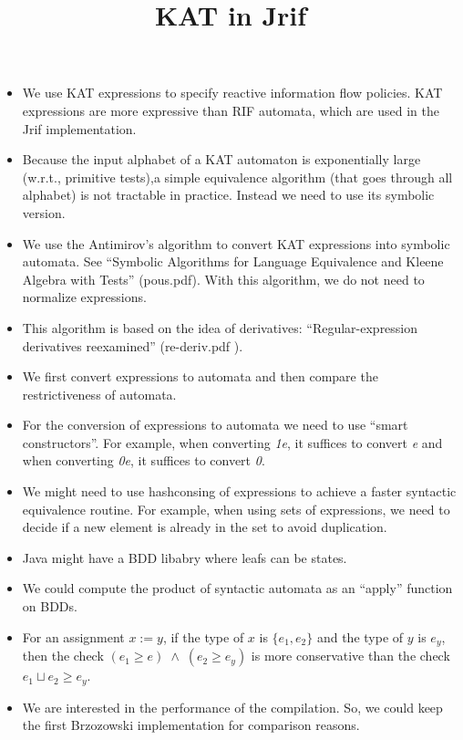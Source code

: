 \documentclass[10pt]{article}
\title{KAT in Jrif}
\begin{document}
\maketitle
\begin{itemize}
\item We use KAT expressions to specify reactive information flow policies. KAT expressions are more expressive than RIF automata, which are used in the Jrif implementation.
\item Because the input alphabet of a KAT automaton is exponentially large (w.r.t., primitive tests),a simple equivalence algorithm (that goes through all alphabet) is not tractable in practice. Instead we need to use its symbolic version.
\item We use the Antimirov's algorithm to convert KAT expressions into symbolic automata. See ``Symbolic Algorithms for Language Equivalence and Kleene Algebra with Tests'' (pous.pdf). With this algorithm, we do not need to normalize expressions.
\item This algorithm is based on the idea of derivatives: ``Regular-expression derivatives reexamined'' (re-deriv.pdf
).
\item We first convert expressions to automata and then compare the restrictiveness of automata.
\item For the conversion of expressions to automata we need to use ``smart constructors''. For example, when converting \emph{1e}, it suffices to convert \emph{e} and when converting \emph{0e}, it suffices to convert \emph{0}.
\item We might need to use hashconsing of expressions to achieve a faster syntactic equivalence routine. For example, when using sets of expressions, we need to decide if a new element is already in the set to avoid duplication.
\item Java might have a BDD libabry where leafs can be states.
\item We could compute the product of syntactic automata as an ``apply'' function on BDDs.
\item For an assignment $x:=y$, if the type of $x$ is $\{e_1,e_2\}$ and the type of $y$ is $e_y$, then the check $(e_1\geq e)\;\wedge\;(e_2\geq e_y)$ is more conservative than the check $e_1\sqcup e_2\geq e_y$.
\item We are interested in the performance of the compilation. So, we could keep the first Brzozowski implementation for comparison reasons.
\end{itemize}
\end{document}
